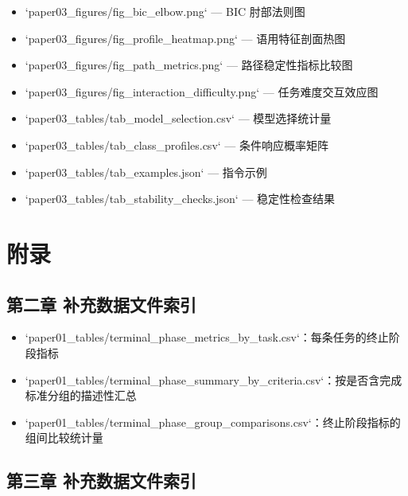 \documentclass[12pt,a4paper,openany,oneside]{ctexrep}
\begin{document}
\begin{itemize}
\item `paper03\_figures/fig\_bic\_elbow.png` — BIC 肘部法则图

\item `paper03\_figures/fig\_profile\_heatmap.png` — 语用特征剖面热图

\item `paper03\_figures/fig\_path\_metrics.png` — 路径稳定性指标比较图

\item `paper03\_figures/fig\_interaction\_difficulty.png` — 任务难度交互效应图

\item `paper03\_tables/tab\_model\_selection.csv` — 模型选择统计量

\item `paper03\_tables/tab\_class\_profiles.csv` — 条件响应概率矩阵

\item `paper03\_tables/tab\_examples.json` — 指令示例

\item `paper03\_tables/tab\_stability\_checks.json` — 稳定性检查结果
\end{itemize}


\newpage

\appendix
\chapter{附录}


\section{第二章 补充数据文件索引}


\begin{itemize}
\item `paper01\_tables/terminal\_phase\_metrics\_by\_task.csv`：每条任务的终止阶段指标
\item `paper01\_tables/terminal\_phase\_summary\_by\_criteria.csv`：按是否含完成标准分组的描述性汇总
\item `paper01\_tables/terminal\_phase\_group\_comparisons.csv`：终止阶段指标的组间比较统计量
\end{itemize}


\section{第三章 补充数据文件索引}
\end{document}
